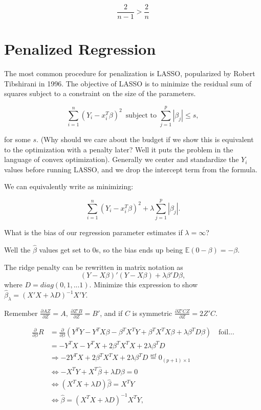 \documentclass[
  letterpaper,
  DIV=11,
  numbers=noendperiod]{scrreport}
\begin{document}
\[\frac{2}{n-1} > \frac{2}{n}\]

\hypertarget{penalized-regression}{%
\section{Penalized Regression}\label{penalized-regression}}

The most common procedure for penalization is LASSO, popularized by
Robert Tibshirani in 1996. The objective of LASSO is to minimize the
residual sum of squares subject to a constraint on the size of the
parameters.

\[\sum_{i=1}^n (Y_i - x_i^T \beta)^2 \, \text{ subject to } \sum_{j=1}^p |\beta_j| \leq s,\]

for some \(s\). (Why should we care about the budget if we show this is
equivalent to the optimization with a penalty later? Well it puts the
problem in the language of convex optimization). Generally we center and
standardize the \(Y_i\) values before running LASSO, and we drop the
intercept term from the formula.

We can equivalently write as minimizing:

\[\sum_{i=1}^n (Y_i - x_i^T \beta)^2 + \lambda \sum_{j=1}^p |\beta_j|.\]

What is the bias of our regression parameter estimates if
\(\lambda = \infty\)?

Well the \(\hat \beta\) values get set to 0s, so the bias ends up being
\(\mathbb E(0 - \beta) = -\beta\).

The ridge penalty can be rewritten in matrix notation as
\[(Y-X\beta)'(Y-X\beta) + \lambda \beta' D\beta,\] where
\(D = diag(0,1,...1).\) Minimize this expression to show
\(\hat \beta_{\lambda} = (X'X + \lambda D)^{-1} X'Y.\)

Remember
\(\frac{\partial AZ}{\partial Z} = A, \, \frac{\partial Z'B}{\partial Z} = B'\),
and if \(C\) is symmetric \(\frac{\partial Z'CZ}{\partial Z} = 2Z'C.\)

\[\begin{aligned} 
\frac{\partial}{\partial \beta} R & = \frac{\partial}{\partial \beta}
(Y^TY - Y^T X \beta - \beta^T X^T Y + \beta^T X^T X \beta + \lambda \beta^T D
\beta) \quad \text{foil...} \\
& = -Y^TX - Y^TX + 2 \beta^T X^TX + 2\lambda \beta^T D \\ 
& \Rightarrow -2Y^TX + 2 \beta^T X^TX + 2\lambda \beta^T D \stackrel{set}{=} 0_{(p+1) \times 1} \\ 
& \Leftrightarrow -X^TY + X^T \hat \beta + \lambda D\beta = 0 \\ 
& \Leftrightarrow (X^TX + \lambda D)\hat \beta = X^T Y \\ 
& \Leftrightarrow \hat \beta = (X^T X + \lambda D)^{-1} X^T Y,
\end{aligned}\]
\end{document}
